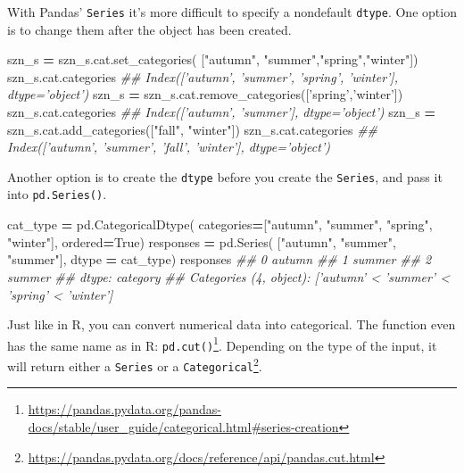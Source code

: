 \documentclass[12pt,krantz2]{krantz}
\makeatletter
\newenvironment{Shaded}{\begin{snugshade}}{\end{snugshade}}
\newcommand{\CommentTok}[1]{\textcolor[rgb]{0.37,0.37,0.37}{\textit{#1}}}
\newcommand{\NormalTok}[1]{#1}
\newcommand{\OperatorTok}[1]{\textcolor[rgb]{0.43,0.43,0.43}{\textbf{#1}}}
\newcommand{\StringTok}[1]{\textcolor[rgb]{0.5,0.5,0.5}{#1}}
\newcommand{\VariableTok}[1]{\textcolor[rgb]{0,0,0}{#1}}
\renewcommand{\href}[2]{#2\footnote{\url{#1}}}
\newenvironment{kframe}{%
\medskip{}
\setlength{\fboxsep}{.8em}
 \def\at@end@of@kframe{}%
 \ifinner\ifhmode%
  \def\at@end@of@kframe{\end{minipage}}%
  \begin{minipage}{\columnwidth}%
 \fi\fi%
 \def\FrameCommand##1{\hskip\@totalleftmargin \hskip-\fboxsep
 \colorbox{shadecolor}{##1}\hskip-\fboxsep
     \hskip-\linewidth \hskip-\@totalleftmargin \hskip\columnwidth}%
 \MakeFramed {\advance\hsize-\width
   \@totalleftmargin\z@ \linewidth\hsize
   \@setminipage}}%
 {\par\unskip\endMakeFramed%
 \at@end@of@kframe}
\renewenvironment{Shaded}{\begin{kframe}}{\end{kframe}}
\makeatother
\begin{document}
With Pandas' \texttt{Series} it's more difficult to specify a nondefault \texttt{dtype}. One option is to change them after the object has been created.

\begin{Shaded}
\begin{Highlighting}[]
\NormalTok{szn_s }\OperatorTok{=}\NormalTok{ szn_s.cat.set_categories(}
\NormalTok{  [}\StringTok{"autumn"}\NormalTok{, }\StringTok{"summer"}\NormalTok{,}\StringTok{"spring"}\NormalTok{,}\StringTok{"winter"}\NormalTok{])}
\NormalTok{szn_s.cat.categories}
\CommentTok{## Index(['autumn', 'summer', 'spring', 'winter'], dtype='object')}
\NormalTok{szn_s }\OperatorTok{=}\NormalTok{ szn_s.cat.remove_categories([}\StringTok{'spring'}\NormalTok{,}\StringTok{'winter'}\NormalTok{])}
\NormalTok{szn_s.cat.categories}
\CommentTok{## Index(['autumn', 'summer'], dtype='object')}
\NormalTok{szn_s }\OperatorTok{=}\NormalTok{ szn_s.cat.add_categories([}\StringTok{"fall"}\NormalTok{, }\StringTok{"winter"}\NormalTok{])}
\NormalTok{szn_s.cat.categories}
\CommentTok{## Index(['autumn', 'summer', 'fall', 'winter'], dtype='object')}
\end{Highlighting}
\end{Shaded}

Another option is to create the \texttt{dtype} before you create the \texttt{Series}, and pass it into \texttt{pd.Series()}.

\begin{Shaded}
\begin{Highlighting}[]
\NormalTok{cat_type }\OperatorTok{=}\NormalTok{ pd.CategoricalDtype(}
\NormalTok{  categories}\OperatorTok{=}\NormalTok{[}\StringTok{"autumn"}\NormalTok{, }\StringTok{"summer"}\NormalTok{, }\StringTok{"spring"}\NormalTok{, }\StringTok{"winter"}\NormalTok{],}
\NormalTok{  ordered}\OperatorTok{=}\VariableTok{True}\NormalTok{)}
\NormalTok{responses }\OperatorTok{=}\NormalTok{ pd.Series(}
\NormalTok{  [}\StringTok{"autumn"}\NormalTok{, }\StringTok{"summer"}\NormalTok{, }\StringTok{"summer"}\NormalTok{], }
\NormalTok{  dtype }\OperatorTok{=}\NormalTok{ cat_type)}
\NormalTok{responses}
\CommentTok{## 0    autumn}
\CommentTok{## 1    summer}
\CommentTok{## 2    summer}
\CommentTok{## dtype: category}
\CommentTok{## Categories (4, object): ['autumn' < 'summer' < 'spring' < 'winter']}
\end{Highlighting}
\end{Shaded}

Just like in R, you can convert numerical data into categorical. The function even has the same name as in R: \href{https://pandas.pydata.org/pandas-docs/stable/user_guide/categorical.html\#series-creation}{\texttt{pd.cut()}}. Depending on the type of the input, \href{https://pandas.pydata.org/docs/reference/api/pandas.cut.html}{it will return either a \texttt{Series} or a \texttt{Categorical}}.
\end{document}
